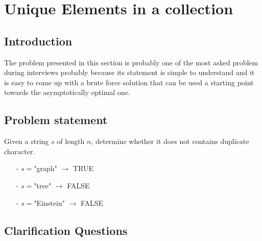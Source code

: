 %


\chapter{Unique Elements in a collection}
\label{ch:unique_elements}
\section*{Introduction}
The problem presented in this section is probably one of the most asked problem during interviews probably because its statement is simple to understand and it is easy to come up with a brute force solution that can be used a starting point towards the asymptotically optimal one. 

\section{Problem statement}
Given a string $s$ of length $n$, determine whether it does not contains duplicate character. 

\begin{example}
\hfill
	\begin{itemize}
		\item [-] $s=$"graph" $ \longrightarrow$ TRUE
		\item [-] $s=$"tree" $ \longrightarrow$ FALSE
		\item [-] $s=$"Einstein" $ \longrightarrow$ FALSE
	\end{itemize}
	
\end{example}

\section{Clarification Questions}

